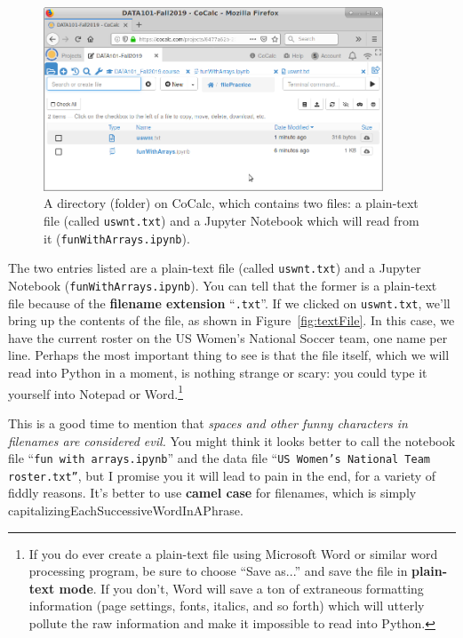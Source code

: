 \begin{figure}[ht]
\centering
\includegraphics[width=0.9\textwidth]{folder.png}
\medskip
\caption{A directory (folder) on CoCalc, which contains two files: a plain-text
file (called \texttt{uswnt.txt}) and a Jupyter Notebook which will read from it
(\texttt{funWithArrays.ipynb}).}
\label{fig:folder}
\end{figure}


The two entries listed are a plain-text file (called \texttt{uswnt.txt}) and a
Jupyter Notebook (\texttt{funWithArrays.ipynb}). You can tell that the former
is a plain-text file because of the \textbf{filename extension}
``\texttt{.txt}''. If we clicked on \texttt{uswnt.txt}, we'll bring up the
contents of the file, as shown in Figure~\ref{fig:textFile}. In this case, we
have the current roster on the US Women's National Soccer team, one name per
line. Perhaps the most important thing to see is that the file itself, which we
will read into Python in a moment, is nothing strange or scary: you could type
it yourself into Notepad or Word.\footnote{If you do ever create a plain-text
file using Microsoft Word or similar word processing program, be sure to choose
``Save as...'' and save the file in \textbf{plain-text mode}. If you don't,
Word will save a ton of extraneous formatting information (page settings,
fonts, italics, and so forth) which will utterly pollute the raw information
and make it impossible to read into Python.}


This is a good time to mention that \textit{spaces and other funny characters
in filenames are considered evil.} You might think it looks better to call the
notebook file ``\texttt{fun with arrays.ipynb}'' and the data file ``\texttt{US
Women's National Team roster.txt''}, but I promise you it will lead to pain in
the end, for a variety of fiddly reasons. It's better to use \textbf{camel
case} for filenames, which is simply
capitalizingEachSuccessive\-Word\-InAPhrase.

